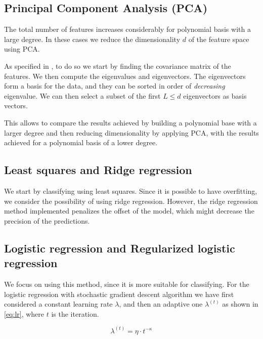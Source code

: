 \documentclass[10pt,conference,compsocconf]{IEEEtran}
\begin{document}
\subsection{Principal Component Analysis (PCA)} %
\label{sub:principal_component_analysis}
  The total number of features increases considerably for polynomial basis with a large degree. In these cases we reduce the dimensionality $d$ of the feature space using PCA.

  As specified in \cite{smith02}, to do so we start by finding the covariance matrix of the features. We then compute the eigenvalues and eigenvectors. The eigenvectors form a basis for the data, and they can be sorted in order of \emph{decreasing} eigenvalue. We can then select a subset of the first $L\leq d$ eigenvectors as basis vectors.

  This allows to compare the results achieved by building a polynomial base with a larger degree and then reducing dimensionality by applying PCA, with the results achieved for a polynomial basis of a lower degree.

\subsection{Least squares and Ridge regression} %
\label{sub:least_squares_and_ridge_regression}
  We start by classifying using least squares. Since it is possible to have overfitting, we consider the possibility of using ridge regression. However, the ridge regression method implemented penalizes the offset of the model, which might decrease the precision of the predictions.


\subsection{Logistic regression and Regularized logistic regression} %
\label{sub:logistic_regression_and_regularized_logistic_regression}
  We focus on using this method, since it is more suitable for classifying. For the logistic regression with stochastic gradient descent algorithm we have first considered a constant learning rate $\lambda$, and then an adaptive one $\lambda^{(t)}$ as shown in \ref{eq:lr}, where $t$ is the iteration.

  \begin{equation}
    \label{eq:lr}
      \lambda^{(t)} = \eta \cdot t ^{- \kappa}
  \end{equation}
\end{document}
